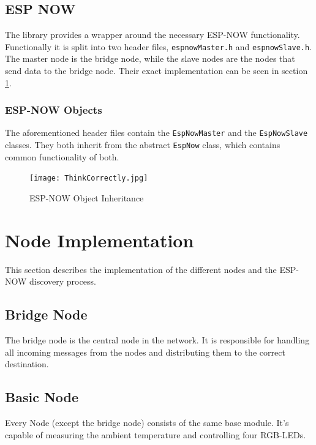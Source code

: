         \subsection{ESP NOW}
        The library provides a wrapper around the necessary ESP-NOW functionality.
        Functionally it is split into two header files, \texttt{espnowMaster.h} and 
        \texttt{espnowSlave.h}. The master node is the bridge node, while the slave
        nodes are the nodes that send data to the bridge node. Their exact implementation
        can be seen in section \ref{sec:node_implemtenation}.
            \subsubsection{ESP-NOW Objects}
            The aforementioned header files contain the \texttt{EspNowMaster} and the
            \texttt{EspNowSlave} classes. They both inherit from the abstract 
            \texttt{EspNow} class, which contains common functionality of both.
            \begin{figure}[H]
                \centering
                \texttt{[image: ThinkCorrectly.jpg]}
                \caption{ESP-NOW Object Inheritance}
            \end{figure}
    
\section{Node Implementation} \label{sec:node_implemtenation}
This section describes the implementation of the different nodes and the ESP-NOW
discovery process.
    \subsection{Bridge Node} 
    The bridge node is the central node in the network. It is responsible for
    handling all incoming messages from the nodes and distributing them to the
    correct destination.


    \subsection{Basic Node}
    Every Node (except the bridge node) consists of the same base module. It's
    capable of measuring the ambient temperature and controlling four RGB-LEDs.


